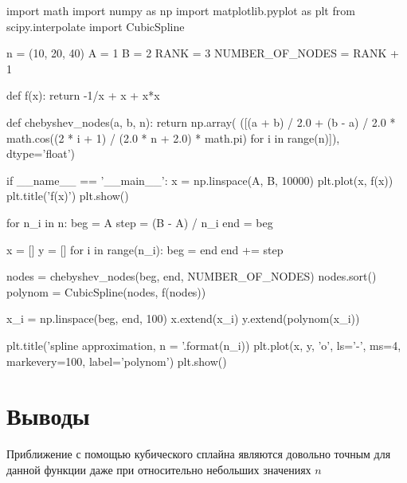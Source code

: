 \documentclass{article}
\begin{document}
\begin{python}
import math
import numpy as np
import matplotlib.pyplot as plt
from scipy.interpolate import CubicSpline

n = (10, 20, 40)
A = 1
B = 2
RANK = 3
NUMBER_OF_NODES = RANK + 1


def f(x):
	return -1/x + x + x*x


def chebyshev_nodes(a, b, n):
	return np.array(
		([(a + b) / 2.0 + (b - a) / 2.0 * math.cos((2 * i + 1) / (2.0 * n + 2.0) * math.pi)
		for i in range(n)]), dtype='float')


if __name__ == '__main__':
	x = np.linspace(A, B, 10000)
	plt.plot(x, f(x))
	plt.title('f(x)')
	plt.show()

	for n_i in n:
		beg = A
		step = (B - A) / n_i
		end = beg

		x = []
		y = []
		for i in range(n_i):
		beg = end
		end += step

		nodes = chebyshev_nodes(beg, end, NUMBER_OF_NODES)
		nodes.sort()
		polynom = CubicSpline(nodes, f(nodes))

		x_i = np.linspace(beg, end, 100)
		x.extend(x_i)
		y.extend(polynom(x_i))

	plt.title('spline approximation, n = {}'.format(n_i))
	plt.plot(x, y, 'o', ls='-', ms=4, markevery=100, label='polynom')
	plt.show()

\end{python}

\section{Выводы}

Приближение с помощью кубического сплайна являются довольно точным для данной функции даже при относительно небольших значениях $n$
\end{document}
